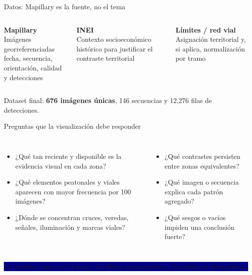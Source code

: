 \documentclass[aspectratio=169,10pt]{beamer}
\begin{document}
\begin{frame}{Datos: Mapillary es la fuente, no el tema}
\begin{columns}[T,onlytextwidth]
\colorbox{mist}{\parbox[c][3.3cm][c]{0.96\linewidth}{\centering\Large\textbf{Mapillary}\\[8pt]\small Imágenes georreferenciadas\\fecha, secuencia, orientación, calidad y detecciones}}
\colorbox{sand}{\parbox[c][3.3cm][c]{0.96\linewidth}{\centering\Large\textbf{INEI}\\[8pt]\small Contexto socioeconómico histórico para justificar el contraste territorial}}
\colorbox{mist}{\parbox[c][3.3cm][c]{0.96\linewidth}{\centering\Large\textbf{Límites / red vial}\\[8pt]\small Asignación territorial y, si aplica, normalización por tramo}}
\end{columns}
\vspace{0.55cm}
\begin{center}\large Dataset final: \textbf{676 imágenes únicas}, 146 secuencias y 12,276 filas de detecciones.\end{center}
\end{frame}

\begin{frame}{Preguntas que la visualización debe responder}
\small
\begin{columns}[T,onlytextwidth]
\begin{itemize}
  \item ¿Qué tan reciente y disponible es la evidencia visual en cada zona?
  \item ¿Qué elementos peatonales y viales aparecen con mayor frecuencia por 100 imágenes?
  \item ¿Dónde se concentran cruces, veredas, señales, iluminación y marcas viales?
\end{itemize}
\begin{itemize}
  \item ¿Qué contrastes persisten entre zonas equivalentes?
  \item ¿Qué imagen o secuencia explica cada patrón agregado?
  \item ¿Qué sesgos o vacíos impiden una conclusión fuerte?
\end{itemize}
\end{columns}
\vspace{0.45cm}
\colorbox{navy}{\parbox[c][1.1cm][c]{0.98\linewidth}{\centering\color{white}\large La interfaz conectará el mapa, los filtros comparativos y la evidencia fotográfica.}}
\end{frame}
\end{document}
